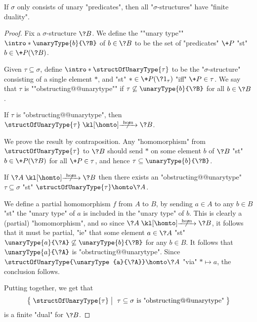 \begin{property}
	\AP\label{prop:finite-duality-unary-predicates}
	If $\sigma$ only consists of unary "predicates", then all "$\sigma$-structures"
	have "finite duality".
\end{property}	

\begin{proof}
	Fix a $\sigma$-structure $\?B$. We define the \AP""unary type""
	$\intro*\unaryType{b}{\?B}$ of $b \in \?B$
	to be the set of "predicates" $\+P$ "st" $b \in \+P(\?B)$.
	
	Given $\tau \subseteq \sigma$, define \AP$\intro*\structOfUnaryType{\tau}$
	to be the "$\sigma$-structure"
	consisting of a single element $*$, and "st" $* \in \+P(\?1_\tau)$ "iff"
	$\+P \in \tau$.
	We say that $\tau$ is \AP""obstructing@@unarytype"" if
	$\tau \not\subseteq \unaryType{b}{\?B}$ for all $b \in \?B$.

	\begin{claim}
		\AP\label{claim:finite-duality-unary-predicates-direct}
		If $\tau$ is "obstructing@@unarytype",
		then $\structOfUnaryType{\tau} \nothomto \?B$.
	\end{claim}
	We prove the result by contraposition.
	Any "homomorphism" from $\structOfUnaryType{\tau}$ to $\?B$
	should send $*$ on some element $b$ of $\?B$
	"st" $b \in \+P(\?B)$ for all $\+P \in \tau$, and
	hence $\tau \subseteq \unaryType{b}{\?B}$.

	\begin{claim}
		\AP\label{claim:finite-duality-unary-predicates-converse}
		If $\?A \nothomto \?B$ then there exists an "obstructing@@unarytype"
		$\tau \subseteq \sigma$ "st" $\structOfUnaryType{\tau} \homto \?A$.
	\end{claim}
	We define a partial homomorphism $f$ from $A$ to $B$,
	by sending $a \in A$ to any $b \in B$ "st" the "unary type" of $a$
	is included in the "unary type" of $b$. This is clearly a (partial) "homomorphism",
	and so since $\?A \nothomto \?B$, it follows that it must be partial,
	"ie" that some element $a \in \?A$ "st" $\unaryType{a}{\?A} \not\subseteq
	\unaryType{b}{\?B}$ for any $b \in B$. It follows that $\unaryType{a}{\?A}$
	is "obstructing@@unarytype". Since $\structOfUnaryType{\unaryType{a}{\?A}} \homto \?A$
	"via" $* \mapsto a$, the conclusion follows.

	Putting  together, we get that
	\[
		\big\{\;
			\structOfUnaryType{\tau}
			\;\big\vert\;
			\text{ $\tau \subseteq \sigma$ is "obstructing@@unarytype"} 
		\;\big\}
	\]
	is a finite "dual" for $\?B$.
\end{proof}

